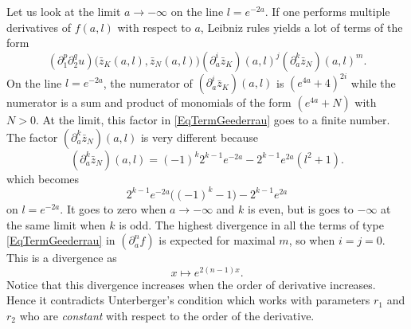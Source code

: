 Let us look at the limit $a\to-\infty$ on the line $l= e^{-2a}$. If one performs multiple derivatives of $f(a,l)$ with respect to $a$, Leibniz rules yields a lot of terms of the form
\begin{equation}		\label{EqTermGeederrau}
	(\partial_1^p\partial_2^qu)\big(\bar{z}_K(a,l),\bar{z}_N(a,l)\big)(\partial_a^i\bar{z}_K)(a,l)^j(\partial_a^k\bar{z}_N)(a,l)^m.
\end{equation}
On the line $l= e^{-2a}$, the numerator of $(\partial_a^i\bar{z}_K)(a,l)$ is $( e^{4a}+4)^{2i}$ while the numerator is a sum and product of monomials of the form $( e^{4a}+N)$ with $N > 0$. At the limit, this factor in \eqref{EqTermGeederrau} goes to a finite number. The factor $(\partial_a^k\bar{z}_N)(a,l)$ is very different because
\[
	(\partial_a^k\bar{z}_N)(a,l)=(-1)^k2^{k-1} e^{-2a}-2^{k-1} e^{2a}(l^2+1).
\]
which becomes
\[
	2^{k-1} e^{-2a}\big( (-1)^k-1 \big)-2^{k-1} e^{2a}
\]
on $l= e^{-2a}$. It goes to zero when $a\to-\infty$ and $k$ is even, but is goes to $-\infty$ at the same limit when $k$ is odd. The highest divergence in all the terms of type \eqref{EqTermGeederrau} in $(\partial^n_af)$ is expected for maximal $m$, so when $i=j=0$. This is a divergence as
\[
	x\mapsto e^{2(n-1)x}.
\]
Notice that this divergence increases when the order of derivative increases. Hence it contradicts Unterberger's condition which works with parameters $r_1$ and $r_2$ who are \emph{constant} with respect to the order of the derivative.
